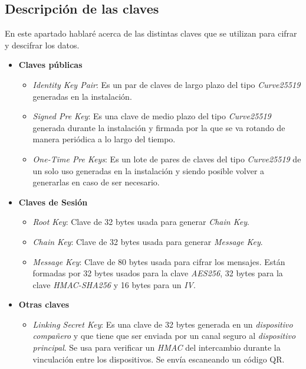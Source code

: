 \subsection{Descripción de las claves}
En este apartado hablaré acerca de las distintas claves que se utilizan para cifrar y descifrar los datos.
\begin{itemize}
	\item \textbf{Claves públicas}
		\begin{itemize}
			\item \emph{Identity Key Pair}: Es un par de claves de largo plazo del tipo \emph{Curve25519} generadas en la instalación.
			\item \emph{Signed Pre Key}: Es una clave de medio plazo del tipo \emph{Curve25519} generada durante la instalación y firmada por la  que se va rotando de manera periódica a lo largo del tiempo.
			\item \emph{One-Time Pre Keys}: Es un lote de pares de claves del tipo \emph{Curve25519} de un solo uso generadas en la instalación y siendo posible volver a generarlas en caso de ser necesario.
		\end{itemize}
	\item \textbf{Claves de Sesión}
		\begin{itemize}
			\item \emph{Root Key}: Clave de 32 bytes usada para generar \emph{Chain Key}.
			\item \emph{Chain Key}: Clave de 32 bytes usada para generar \emph{Message Key}.
			\item \emph{Message Key}: Clave de 80 bytes usada para cifrar los mensajes. Están formadas por 32 bytes usados para la clave \emph{AES256}, 32 bytes para la clave \emph{HMAC-SHA256} y 16 bytes para un \emph{IV}.
		\end{itemize}
	\item \textbf{Otras claves}
		\begin{itemize}
			\item \emph{Linking Secret Key}: Es una clave de 32 bytes generada en un \emph{dispositivo compañero} y que tiene que ser enviada por un canal seguro al \emph{dispositivo principal}. Se usa para verificar un \emph{HMAC} del intercambio durante la vinculación entre los dispositivos. Se envía escaneando un código QR.
		\end{itemize}
\end{itemize}

